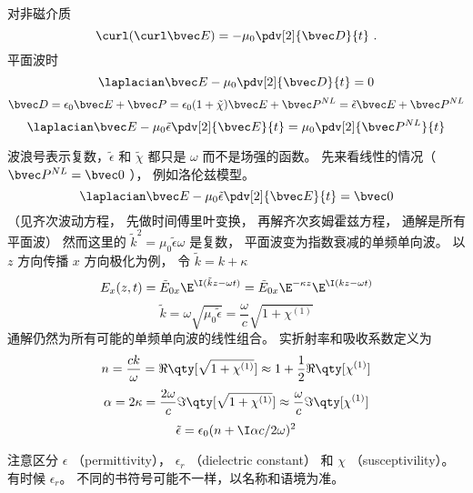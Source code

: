 
对非磁介质
\begin{equation}
\curl (\curl \bvec E) = -\mu_0 \pdv[2]{\bvec D}{t}~.
\end{equation}
平面波时
\begin{equation}
\laplacian \bvec E - \mu_0 \pdv[2]{\bvec D}{t} = 0
\end{equation}
\begin{equation}
\bvec D = \epsilon_0 \bvec E + \bvec P = \epsilon_0(1 + \tilde\chi)\bvec E + \bvec P^{NL} = \tilde \epsilon \bvec E + \bvec P^{NL}
\end{equation}
\begin{equation}
\laplacian\bvec E - \mu_0\tilde\epsilon \pdv[2]{\bvec E}{t} = \mu_0 \pdv[2]{\bvec P^{NL}}{t}
\end{equation}
 
波浪号表示复数，$\tilde\epsilon$ 和 $\tilde\chi$ 都只是 $\omega$ 而不是场强的函数。 先来看线性的情况（ $\bvec P^{NL} = \bvec 0$ ）， 例如洛伦兹模型。
\begin{equation}
\laplacian\bvec E - \mu_0 \tilde\epsilon \pdv[2]{\bvec E}{t} = \bvec 0
\end{equation}
（见齐次波动方程， 先做时间傅里叶变换， 再解齐次亥姆霍兹方程， 通解是所有平面波） 然而这里的 $\tilde k^2 = \mu_0 \tilde \epsilon \omega$ 是复数， 平面波变为指数衰减的单频单向波。 以 $z$ 方向传播 $x$ 方向极化为例， 令  $\tilde k = k + \kappa$
\begin{equation}
E_x(z,t) = \tilde E_{0x} \E^{\I(\tilde kz - \omega t)} = \tilde E_{0x} \E^{-\kappa z} \E^{\I(kz - \omega t)}
\end{equation}
\begin{equation}
\tilde k = \omega \sqrt{\mu_0\tilde\epsilon} = \frac{\omega }{c}\sqrt {1 + \chi ^{(1)}}
\end{equation}
通解仍然为所有可能的单频单向波的线性组合。 实折射率和吸收系数定义为
\begin{equation}
n = \frac{ck}{\omega } = \Re\qty[\sqrt{1 + \chi ^{(1)}}] \approx 1 + \frac12 \Re\qty[\chi^{(1)}]
\end{equation}
\begin{equation}
\alpha  = 2\kappa  = \frac{2\omega}{c} \Im\qty[\sqrt{1+\chi^{(1)}}] \approx \frac{\omega}{c}\Im\qty[\chi ^{(1)}]
\end{equation}
\begin{equation}
\tilde \epsilon  = \epsilon_0 (n + \I \alpha c/2\omega )^2
\end{equation}
 
注意区分 $\epsilon$ （permittivity）， $\epsilon_r$ （dielectric constant） 和 $\chi$ （susceptivility）。 有时候 $\epsilon_r$。 %
不同的书符号可能不一样，以名称和语境为准。

